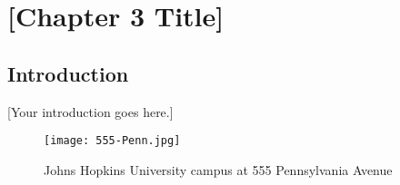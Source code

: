 \chapter{[Chapter 3 Title]}
\label{ch:chapter3}

\section{Introduction}

[Your introduction goes here.]

\begin{figure}[h]
    \centering
    \texttt{[image: 555-Penn.jpg]}
    \caption{Johns Hopkins University campus at 555 Pennsylvania Avenue}
    \label{fig:penn555}
\end{figure}



